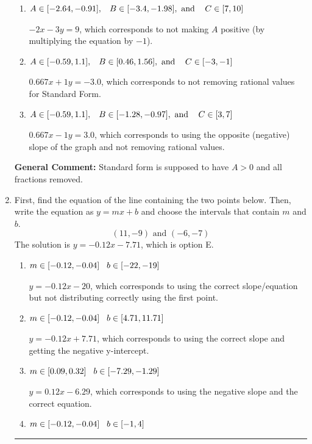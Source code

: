 \documentclass{extbook}[14pt]
\newcommand{\litem}[1]{\item #1

\rule{\textwidth}{0.4pt}}
\begin{document}
\begin{enumerate}
{\begin{enumerate}[label=\Alph*.]
 $2x - 3y = 9$, which corresponds to using the opposite (negative) slope of the graph, but did everything else correctly.
\item \( A \in [-2.64, -0.91], \hspace{3mm} B \in [-3.4, -1.98], \text{ and } \hspace{3mm} C \in [7, 10] \)

 $-2x - 3y = 9$, which corresponds to not making $A$ positive (by multiplying the equation by $-1$).
\item \( A \in [-0.59, 1.1], \hspace{3mm} B \in [0.46, 1.56], \text{ and } \hspace{3mm} C \in [-3, -1] \)

 $0.667x + 1y = -3.0$, which corresponds to not removing rational values for Standard Form.
\item \( A \in [-0.59, 1.1], \hspace{3mm} B \in [-1.28, -0.97], \text{ and } \hspace{3mm} C \in [3, 7] \)

 $0.667x - 1y = 3.0$, which corresponds to using the opposite (negative) slope of the graph and not removing rational values.
\end{enumerate}

\textbf{General Comment:} Standard form is supposed to have $A > 0$ and all fractions removed.
}
\litem{
First, find the equation of the line containing the two points below. Then, write the equation as $ y=mx+b $ and choose the intervals that contain $m$ and $b$.
\[ (11, -9) \text{ and } (-6, -7) \]
The solution is \( y = -0.12x -7.71 \), which is option E.\begin{enumerate}[label=\Alph*.]
\item \( m \in [-0.12, -0.04] \hspace*{3mm} b \in [-22, -19] \)

 $y = -0.12x -20$, which corresponds to using the correct slope/equation but not distributing correctly using the first point.
\item \( m \in [-0.12, -0.04] \hspace*{3mm} b \in [4.71, 11.71] \)

 $y = -0.12x + 7.71$, which corresponds to using the correct slope and getting the negative y-intercept.
\item \( m \in [0.09, 0.32] \hspace*{3mm} b \in [-7.29, -1.29] \)

 $y = 0.12x -6.29$, which corresponds to using the negative slope and the correct equation.
\item \( m \in [-0.12, -0.04] \hspace*{3mm} b \in [-1, 4] \)


\end{enumerate}}
\end{enumerate}
\end{document}
